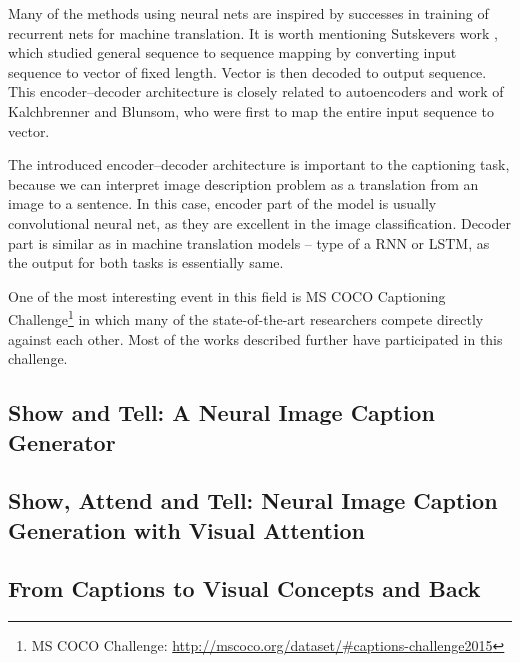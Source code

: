 Many of the methods using neural nets are inspired by successes in training of recurrent nets for machine translation. It is worth mentioning Sutskevers work \cite{DBLP:journals/corr/SutskeverVL14}, which studied general sequence to sequence mapping by converting input sequence to vector of fixed length. Vector is then decoded to output sequence. This encoder--decoder architecture is closely related to autoencoders and work of Kalchbrenner and Blunsom\cite{conf/emnlp/KalchbrennerB13}, who were first to map the entire input sequence to vector.

The introduced encoder--decoder architecture is important to the captioning task, because we can interpret image description problem as a translation from an image to a sentence. In this case, encoder part of the model is usually convolutional neural net, as they are excellent in the image classification\cite{DBLP:journals/corr/SzegedyLJSRAEVR14}. Decoder part is similar as in machine translation models -- type of a RNN or LSTM, as the output for both tasks is essentially same.

One of the most interesting event in this field is MS COCO Captioning Challenge\footnote{MS COCO Challenge: \url{http://mscoco.org/dataset/\#captions-challenge2015}} in which many of the state-of-the-art researchers compete directly against each other. Most of the works described further have participated in this challenge.


		\subsection{Show and Tell: A Neural Image Caption Generator}
		\cite{DBLP:journals/corr/VinyalsTBE14}
		
		
		\subsection{Show, Attend and Tell: Neural Image Caption Generation with Visual Attention}
		\cite{DBLP:journals/corr/XuBKCCSZB15}
		
		\subsection{From Captions to Visual Concepts and Back}
		\cite{DBLP:journals/corr/FangGISDDGHMPZZ14}
		
